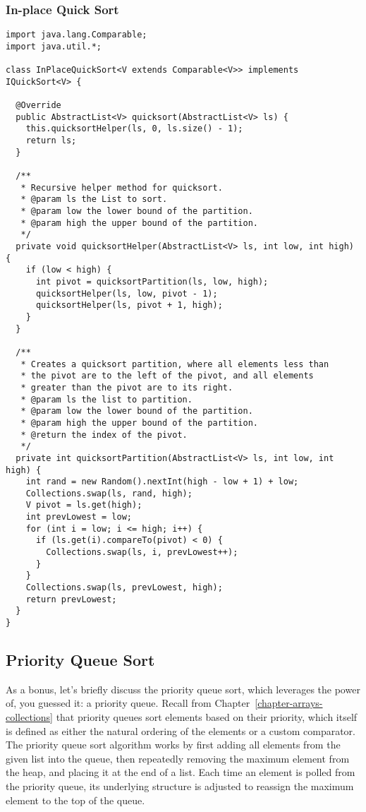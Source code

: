 \subsubsection*{In-place Quick Sort}
\begin{lstlisting}[language=MyJava]
import java.lang.Comparable;
import java.util.*;

class InPlaceQuickSort<V extends Comparable<V>> implements IQuickSort<V> {

  @Override
  public AbstractList<V> quicksort(AbstractList<V> ls) {
    this.quicksortHelper(ls, 0, ls.size() - 1);
    return ls;
  }

  /**
   * Recursive helper method for quicksort.
   * @param ls the List to sort.
   * @param low the lower bound of the partition.
   * @param high the upper bound of the partition.
   */
  private void quicksortHelper(AbstractList<V> ls, int low, int high) {
    if (low < high) {
      int pivot = quicksortPartition(ls, low, high);
      quicksortHelper(ls, low, pivot - 1);
      quicksortHelper(ls, pivot + 1, high);
    }
  }

  /**
   * Creates a quicksort partition, where all elements less than 
   * the pivot are to the left of the pivot, and all elements 
   * greater than the pivot are to its right.
   * @param ls the list to partition.
   * @param low the lower bound of the partition.
   * @param high the upper bound of the partition.
   * @return the index of the pivot.
   */
  private int quicksortPartition(AbstractList<V> ls, int low, int high) {
    int rand = new Random().nextInt(high - low + 1) + low;
    Collections.swap(ls, rand, high);
    V pivot = ls.get(high);
    int prevLowest = low;
    for (int i = low; i <= high; i++) {
      if (ls.get(i).compareTo(pivot) < 0) {
        Collections.swap(ls, i, prevLowest++);
      }
    }
    Collections.swap(ls, prevLowest, high);
    return prevLowest;
  }
}
\end{lstlisting}

\newpage
\subsection{Priority Queue Sort}
As a bonus, let's briefly discuss the priority queue sort, which leverages the power of, you guessed it: a priority queue.
Recall from Chapter~\ref{chapter-arrays-collections} that priority queues sort elements based on their priority, which itself is defined as either the natural ordering of the elements or a custom comparator. 
The priority queue sort algorithm works by first adding all elements from the given list into the queue, then repeatedly removing the maximum element from the heap, and placing it at the end of a list. 
Each time an element is polled from the priority queue, its underlying structure is adjusted to reassign the maximum element to the top of the queue.

